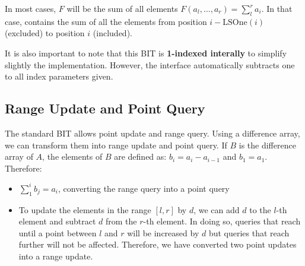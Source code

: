 In most cases, $F$ will be the sum of all elements $F(a_l,\dots, a_r)=\sum_l^r{a_i}$.
In that case,  contains the sum of all the elements from 
position $i-\text{LSOne}(i)$ (excluded) to position $i$ (included).


It is also important to note that this BIT is \textbf{1-indexed interally} to simplify slightly 
the implementation. However, the interface automatically subtracts one to all index parameters
given.
\subsection*{Range Update and Point Query}
The standard BIT allows point update and range query. Using a difference array, we can 
transform them into range update and point query. If $B$ is the difference array
of $A$, the elements of $B$ are defined as:  $b_i=a_i- a_{i-1}$ and $b_1=a_1$.
Therefore:
\begin{itemize}
		\setlength{\itemsep}{2pt}
		\item $\sum_{1}^i b_j=a_i$, converting the range query into 
				a point query
		\item To update the elements in the range $[l,r]$ by $d$, we can add
				$d$ to the $l$-th element and subtract $d$ from the $r$-th element.
				In doing so, queries that reach until a point
				between $l$ and $r$ will be increased by $d$ but queries that reach 
				further will not be affected.
				Therefore, we have converted two point updates into a range update.

\end{itemize}

